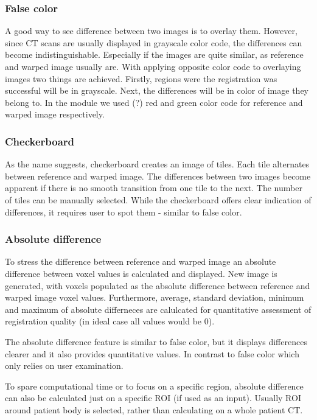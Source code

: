 \documentclass[type=dr, dr=rernat, accentcolor=tud7b,colorbacktitle, bigchapter, openright, twoside, 12pt ]{tudthesis}
\begin{document}
\subsubsection{False color}

A good way to see difference between two images is to overlay them. However, since CT scans are usually displayed in grayscale color code, the differences can become indistinguishable. Especially if the images are quite similar, as reference and warped image usually are. With applying opposite color code to overlaying images two things are achieved. Firstly, regions were the registration was successful will be in grayscale. Next, the differences will be in color of image they belong to. In the module we used (?) red and green color code for reference and warped image respectively. 

\subsubsection{Checkerboard}

As the name suggests, checkerboard creates an image of tiles. Each tile alternates between reference and warped image. The differences between two images become apparent if there is no smooth transition from one tile to the next. The number of tiles can be manually selected. While the checkerboard offers clear indication of differences, it requires user to spot them - similar to false color.

\subsubsection{Absolute difference} 

To stress the difference between reference and warped image an absolute difference between voxel values is calculated and displayed. New image is generated, with voxels populated as the absolute difference between reference and warped image voxel values. Furthermore, average, standard deviation, minimum and maximum of absolute differneces are calulcated for quantitative assessment of registration quality (in ideal case all values would be 0).

The absolute difference feature is similar to false color, but it displays differences clearer and it also provides quantitative values. In contrast to false color which only relies on user examination.

To spare computational time or to focus on a specific region, absolute difference can also be calculated just on a specific ROI (if used as an input). Usually ROI around patient body is selected, rather than calculating on a whole patient CT.
\end{document}
